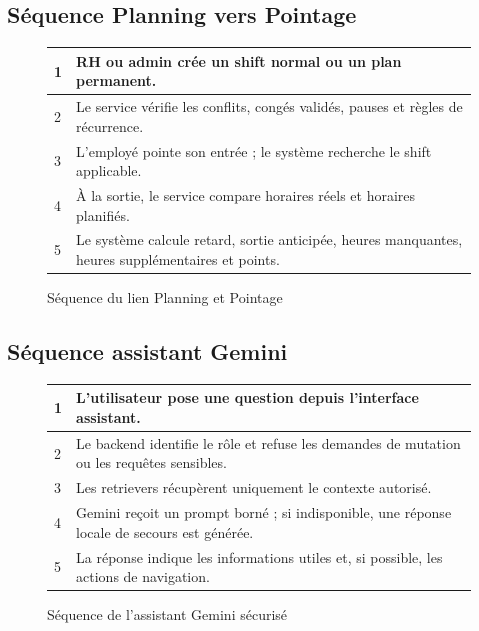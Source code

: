 \documentclass[12pt,a4paper]{report}
\begin{document}
\subsection{Séquence Planning vers Pointage}
\begin{figure}[H]
\centering
\renewcommand{\arraystretch}{1.2}
\begin{tabular}{|p{2cm}|p{11cm}|}
\hline
1 & RH ou admin crée un shift normal ou un plan permanent.\\ \hline
2 & Le service vérifie les conflits, congés validés, pauses et règles de récurrence.\\ \hline
3 & L'employé pointe son entrée ; le système recherche le shift applicable.\\ \hline
4 & À la sortie, le service compare horaires réels et horaires planifiés.\\ \hline
5 & Le système calcule retard, sortie anticipée, heures manquantes, heures supplémentaires et points.\\ \hline
\end{tabular}
\caption{Séquence du lien Planning et Pointage}
\label{fig:sequence-planning-pointage}
\end{figure}

\subsection{Séquence assistant Gemini}
\begin{figure}[H]
\centering
\renewcommand{\arraystretch}{1.2}
\begin{tabular}{|p{2cm}|p{11cm}|}
\hline
1 & L'utilisateur pose une question depuis l'interface assistant.\\ \hline
2 & Le backend identifie le rôle et refuse les demandes de mutation ou les requêtes sensibles.\\ \hline
3 & Les retrievers récupèrent uniquement le contexte autorisé.\\ \hline
4 & Gemini reçoit un prompt borné ; si indisponible, une réponse locale de secours est générée.\\ \hline
5 & La réponse indique les informations utiles et, si possible, les actions de navigation.\\ \hline
\end{tabular}
\caption{Séquence de l'assistant Gemini sécurisé}
\label{fig:sequence-gemini}
\end{figure}
\end{document}
